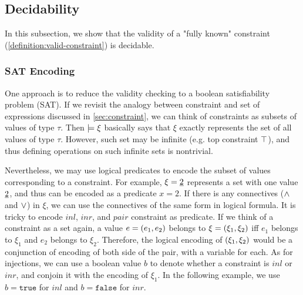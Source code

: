 \subsection{Decidability}
\label{sec:decidability}
In this subsection, we show that the validity of a "fully known" constraint (\autoref{definition:valid-constraint}) is decidable.



\subsubsection{SAT Encoding}
 One approach is to reduce the validity checking to a boolean satisfiability problem (SAT). 
If we revisit the analogy between constraint and set of expressions discussed in \autoref{sec:constraint}, we can think of constraints as subsets of values of type $\tau$.
Then $\models \xi$ basically says that $\xi$ exactly represents the set of all values of type $\tau$. 
However, such set may be infinite (e.g. top constraint $\top$),
and thus defining operations on such infinite sets is nontrivial. 

Nevertheless, we may use logical predicates to encode the subset of values corresponding to a constraint. 
For example, $\xi=\underline{2}$ represents a set with one value $\underline{2}$, and thus can be encoded as a predicate $x=2$. 
If there is any connectives ($\wedge$ and $\vee$) in $\xi$, we can use the connectives of the same form in logical formula. 
It is tricky to encode $inl$, $inr$, and $pair$ constraint as predicate. 
If we think of a constraint as a set again, a value $e=(e_1 , e_2)$ belongs to $\xi=(\xi_1 , \xi_2)$ iff $e_1$ belongs to $\xi_1$ and $e_2$ belongs to $\xi_2$. 
Therefore, the logical encoding of $(\xi_1 , \xi_2)$ would be a conjunction of encoding of both side of the pair, with a variable for each.
As for injections, we can use a boolean value $b$ to denote whether a constraint is $inl$ or $inr$, and conjoin it with the encoding of $\xi_1$. In the following example, we use $b=\mathtt{true}$ for $inl$ and $b=\mathtt{false}$ for $inr$.

